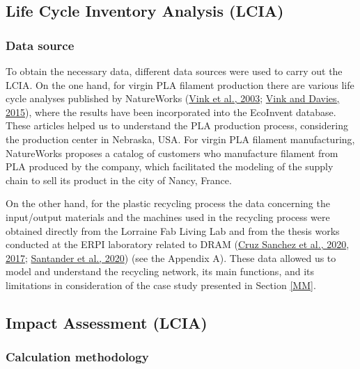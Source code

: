 \documentclass[12pt]{elsarticle} %
\begin{document}
\hypertarget{life-cycle-inventory-analysis-lcia}{%
\subsection{Life Cycle Inventory Analysis (LCIA)}\label{life-cycle-inventory-analysis-lcia}}

\hypertarget{data-source}{%
\subsubsection{Data source}\label{data-source}}

To obtain the necessary data, different data sources were used to carry out the LCIA.
On the one hand, for virgin PLA filament production there are various life cycle analyses published by NatureWorks (\protect\hyperlink{ref-vink2003}{Vink et al., 2003}; \protect\hyperlink{ref-vink2015}{Vink and Davies, 2015}), where the results have been incorporated into the EcoInvent database.
These articles helped us to understand the PLA production process, considering the production center in Nebraska, USA.
For virgin PLA filament manufacturing, NatureWorks proposes a catalog of customers who manufacture filament from PLA produced by the company, which facilitated the modeling of the supply chain to sell its product in the city of Nancy, France.

On the other hand, for the plastic recycling process the data concerning the input/output materials and the machines used in the recycling process were obtained directly from the Lorraine Fab Living Lab and from the thesis works conducted at the ERPI laboratory related to DRAM (\protect\hyperlink{ref-CruzSanchez2020}{Cruz Sanchez et al., 2020}, \protect\hyperlink{ref-CruzSanchez2017}{2017}; \protect\hyperlink{ref-Santander2020}{Santander et al., 2020}) (see the Appendix A).
These data allowed us to model and understand the recycling network, its main functions, and its limitations in consideration of the case study presented in Section \ref{MM}.

\hypertarget{impact-assessment-lcia}{%
\subsection{Impact Assessment (LCIA)}\label{impact-assessment-lcia}}

\hypertarget{calculation-methodology}{%
\subsubsection{Calculation methodology}\label{calculation-methodology}}
\end{document}
